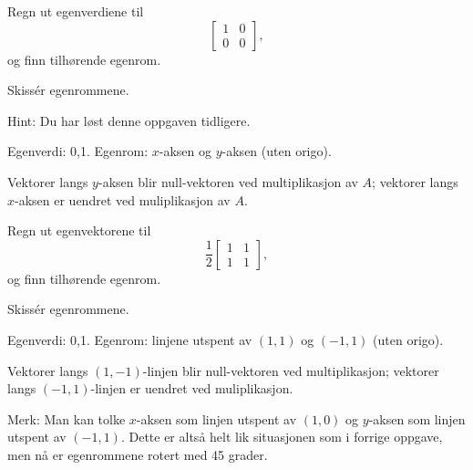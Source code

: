 \begin{oppgave}

\begin{punkt}
Regn ut egenverdiene til $$\begin{bmatrix}
1 & 0\\
0 & 0
\end{bmatrix},
$$ og finn tilhørende egenrom. 
\end{punkt}

\begin{punkt}
Skissér egenrommene.

\noindent 
Hint: Du har løst denne oppgaven tidligere.
\end{punkt}

\end{oppgave}

\begin{losning}

\begin{punkt}
Egenverdi: 0,1. Egenrom: $x$-aksen og $y$-aksen (uten origo).
\end{punkt}

\begin{punkt}
Vektorer langs $y$-aksen blir null-vektoren ved multiplikasjon av $A$; vektorer langs $x$-aksen er uendret ved muliplikasjon av $A$.
\end{punkt}

\end{losning}


\begin{oppgave}
\begin{punkt}
Regn ut egenvektorene til $$\frac{1}{2}\begin{bmatrix}
1 & 1\\
1 & 1
\end{bmatrix},
$$ og finn tilhørende egenrom.

\end{punkt}

\begin{punkt}
Skissér egenrommene.
\end{punkt}

\end{oppgave}


\begin{losning}

\begin{punkt}
Egenverdi: 0,1. Egenrom: linjene utspent av $(1,1)$ og $(-1,1)$ (uten origo).
\end{punkt}

\begin{punkt}
Vektorer langs $(1,-1)$-linjen blir null-vektoren ved multiplikasjon; vektorer langs $(-1,1)$-linjen er uendret ved muliplikasjon.

\noindent
Merk: Man kan tolke $x$-aksen som linjen utspent av $(1,0)$ og $y$-aksen som linjen utspent av $(-1,1)$. Dette er altså helt lik situasjonen som i forrige oppgave, men nå er egenrommene rotert med 45 grader.
\end{punkt}

\end{losning}




